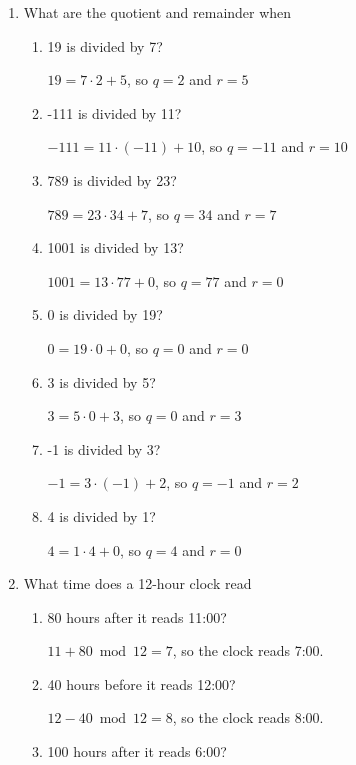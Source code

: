 \documentclass[11pt]{article}
\begin{document}
\begin{enumerate}[label=\textbf{\arabic*.}]
	\item What are the quotient and remainder when
	
	\begin{enumerate}[label=\textbf{\alph*)}]
		\item 19 is divided by 7?
		
		$19 = 7 \cdot 2 + 5$, so $q = 2$ and $r = 5$
		
		\item -111 is divided by 11?
		
		$-111 = 11 \cdot (-11) + 10$, so $q = -11$ and $r = 10$
		
		\item 789 is divided by 23?
		
		$789 = 23 \cdot 34 + 7$, so $q = 34$ and $r = 7$
		
		\item 1001 is divided by 13?
		
		$1001 = 13 \cdot 77 + 0$, so $q = 77$ and $r = 0$
		
		\item 0 is divided by 19?
		
		$0 = 19 \cdot 0 + 0$, so $q = 0$ and $r = 0$
		
		\item 3 is divided by 5?
		
		$3 = 5 \cdot 0 + 3$, so $q = 0$ and $r = 3$
		
		\item -1 is divided by 3?
		
		$-1 = 3 \cdot (-1) + 2$, so $q = -1$ and $r = 2$
		
		\item 4 is divided by 1?
		
		$4 = 1 \cdot 4 + 0$, so $q = 4$ and $r = 0$
	\end{enumerate}

	\item What time does a 12-hour clock read
	
	\begin{enumerate}[label=\textbf{\alph*)}]
		\item 80 hours after it reads 11:00?
		
		$11 + 80 \bmod 12 = 7$, so the clock reads 7:00.
		
		\item 40 hours before it reads 12:00?
		
		$12 - 40 \bmod 12 = 8$, so the clock reads 8:00.
		
		\item 100 hours after it reads 6:00?
		

\end{enumerate}
\end{enumerate}
\end{document}
